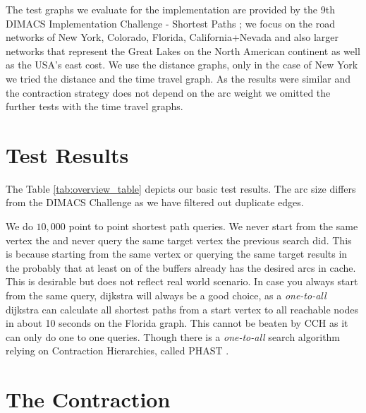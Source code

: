 The test graphs we evaluate for the implementation are provided by the 9th DIMACS Implementation Challenge - Shortest Paths \cite{DIMACS}; we focus on the road networks of New York, Colorado, Florida, California+Nevada and also larger networks that represent the Great Lakes on the North American continent as well as the USA's east cost.
We use the distance graphs, only in the case of New York we tried the distance and the time travel graph.
As the results were similar and the contraction strategy does not depend on the arc weight we omitted the further tests with the time travel graphs.

\section{Test Results}

The Table \ref{tab:overview_table} depicts our basic test results.
The arc size differs from the DIMACS Challenge as we have filtered out duplicate edges.



We do $10,000$ point to point shortest path queries.
We never start from the same vertex the and never query the same target vertex the previous search did.
This is because starting from the same vertex or querying the same target results in the probably that at least on of the buffers already has the desired arcs in cache.
This is desirable but does not reflect real world scenario.
In case you always start from the same query, dijkstra will always be a good choice, as a \textit{one-to-all} dijkstra can calculate all shortest paths from a start vertex to all reachable nodes in about 10 seconds on the Florida graph.
This cannot be beaten by CCH as it can only do one to one queries.
Though there is a \textit{one-to-all} search algorithm relying on Contraction Hierarchies, called PHAST \cite{delling2013phast}. 

\section{The Contraction}

